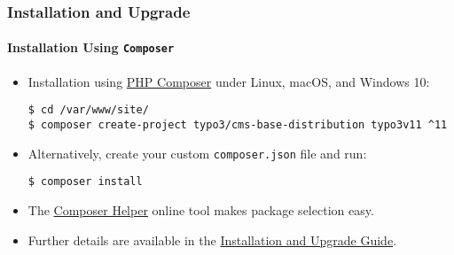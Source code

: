 %

\begin{frame}[fragile]
	\frametitle{Installation and Upgrade}
	\framesubtitle{Installation Using \texttt{Composer}}


	\begin{itemize}
		\item Installation using \href{https://getcomposer.org}{PHP Composer} under Linux, macOS, and Windows 10:
\begin{lstlisting}
$ cd /var/www/site/
$ composer create-project typo3/cms-base-distribution typo3v11 ^11
\end{lstlisting}

		\item Alternatively, create your custom \texttt{composer.json} file and run:
\begin{lstlisting}
$ composer install
\end{lstlisting}

		\item The \href{https://get.typo3.org/misc/composer/helper}{Composer Helper}
			online tool makes package selection easy.

		\item Further details are available in the
			\href{https://docs.typo3.org/m/typo3/guide-installation/master/en-us/}{Installation and Upgrade Guide}.

	\end{itemize}
\end{frame}

